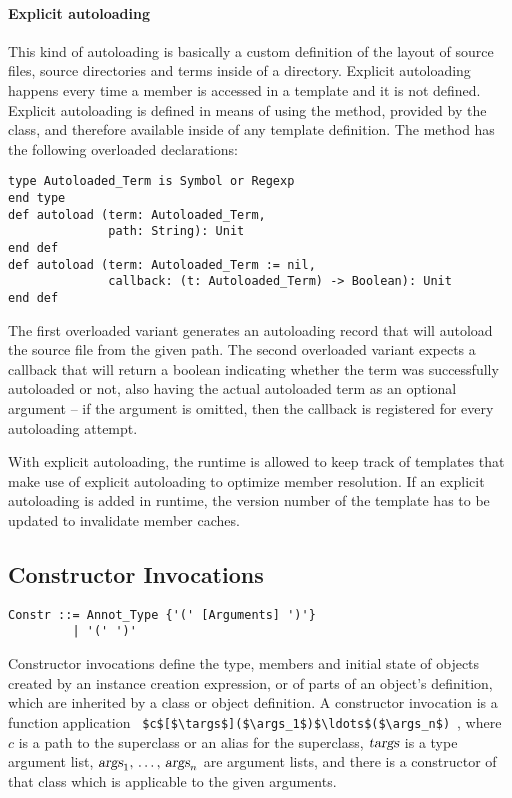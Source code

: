 \paragraph{Explicit autoloading}
This kind of autoloading is basically a custom definition of the layout of source files, source directories and terms inside of a directory. Explicit autoloading happens every time a member is accessed in a template and it is not defined. Explicit autoloading is defined in means of using the  method, provided by the  class, and therefore available inside of any template definition. The method has the following overloaded declarations: 
\begin{lstlisting}
type Autoloaded_Term is Symbol or Regexp 
end type
def autoload (term: Autoloaded_Term, 
              path: String): Unit
end def
def autoload (term: Autoloaded_Term := nil, 
              callback: (t: Autoloaded_Term) -> Boolean): Unit
end def
\end{lstlisting}
The first overloaded variant generates an autoloading record that will autoload the source file from the given path. The second overloaded variant expects a callback that will return a boolean indicating whether the term was successfully autoloaded or not, also having the actual autoloaded term as an optional argument -- if the argument is omitted, then the callback is registered for every autoloading attempt.

With explicit autoloading, the runtime is allowed to keep track of templates that make use of explicit autoloading to optimize member resolution. If an explicit autoloading is added in runtime, the version number of the template has to be updated to invalidate member caches. 







\subsection{Constructor Invocations}
\label{sec:constructor-invocations}

\grammar\begin{lstlisting}
Constr ::= Annot_Type {'(' [Arguments] ')'}
         | '(' ')'
\end{lstlisting}

Constructor invocations define the type, members and initial state of objects created by an instance creation expression, or of parts of an object's definition, which are inherited by a class or object definition. A constructor invocation is a function application ~\lstinline!$c$[$\targs$]($\args_1$)$\ldots$($\args_n$)!~, where $c$ is a path to the superclass or an alias for the superclass, $\mbox{\sl targs}$ is a type argument list, $\mbox{\sl args}_1 ,\, \ldots ,\, \mbox{\sl args}_n$ are argument lists, and there is a constructor of that class which is applicable to the given arguments. 

